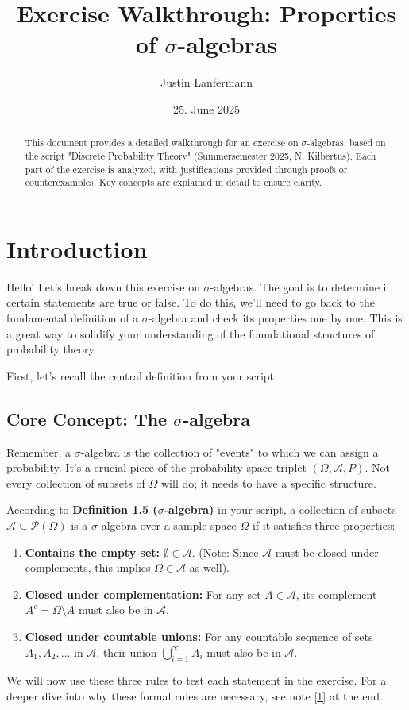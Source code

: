 \documentclass[11pt,a4paper]{article}
\title{Exercise Walkthrough: Properties of $\sigma$-algebras}
\author{Justin Lanfermann}
\date{25. June 2025}
\begin{document}
\maketitle

\begin{abstract}
    This document provides a detailed walkthrough for an exercise on $\sigma$-algebras, based on the script "Discrete Probability Theory" (Summersemester 2025, N. Kilbertus). Each part of the exercise is analyzed, with justifications provided through proofs or counterexamples. Key concepts are explained in detail to ensure clarity.
\end{abstract}

\section{Introduction}

Hello! Let's break down this exercise on $\sigma$-algebras. The goal is to determine if certain statements are true or false. To do this, we'll need to go back to the fundamental definition of a $\sigma$-algebra and check its properties one by one. This is a great way to solidify your understanding of the foundational structures of probability theory.

First, let's recall the central definition from your script.

\subsection{Core Concept: The \texorpdfstring{$\sigma$}{sigma}-algebra}

Remember, a $\sigma$-algebra is the collection of "events" to which we can assign a probability. It's a crucial piece of the probability space triplet $(\Omega, \mathcal{A}, P)$. Not every collection of subsets of $\Omega$ will do; it needs to have a specific structure.

According to \textbf{Definition 1.5 ($\sigma$-algebra)} in your script, a collection of subsets $\mathcal{A} \subseteq \mathcal{P}(\Omega)$ is a $\sigma$-algebra over a sample space $\Omega$ if it satisfies three properties:
\begin{enumerate}
    \item \textbf{Contains the empty set:} $\emptyset \in \mathcal{A}$. (Note: Since $\mathcal{A}$ must be closed under complements, this implies $\Omega \in \mathcal{A}$ as well).
    \item \textbf{Closed under complementation:} For any set $A \in \mathcal{A}$, its complement $A^c = \Omega \setminus A$ must also be in $\mathcal{A}$.
    \item \textbf{Closed under countable unions:} For any countable sequence of sets $A_1, A_2, \ldots$ in $\mathcal{A}$, their union $\bigcup_{i=1}^{\infty} A_i$ must also be in $\mathcal{A}$.
\end{enumerate}
We will now use these three rules to test each statement in the exercise. For a deeper dive into why these formal rules are necessary, see note \hyperlink{note1}{[1]} at the end.
\end{document}
